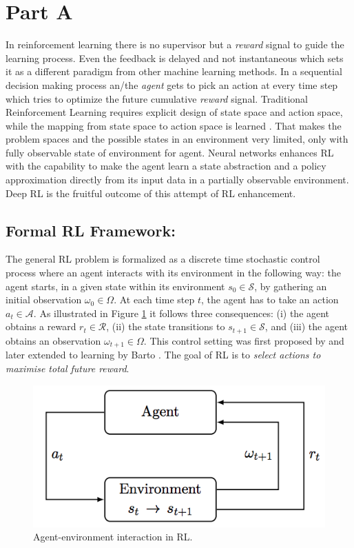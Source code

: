 \section{Part A}
\label{part_a}
In reinforcement learning there is no supervisor but a {\em reward} signal to guide the learning process. Even the feedback is delayed and not instantaneous which sets it as a different paradigm from other machine learning methods. In a sequential decision making process an/the {\em agent} gets to pick an action at every time step which tries to optimize the future cumulative {\em reward} signal.
Traditional Reinforcement Learning
requires explicit design of state space and action space, while the mapping from state space to action space is learned \cite{sutton1998introduction}.
 That makes the problem spaces and the possible states in an environment very limited, only with fully observable state of environment for agent.  Neural networks enhances RL with the capability to make the agent learn a state abstraction and a policy approximation directly from its input data in a partially observable environment. Deep RL is the fruitful outcome of this attempt of RL enhancement.

\subsection{Formal RL Framework:}
\label{formal_rl}
The general RL problem is formalized as a discrete time stochastic
control process where an agent interacts with its environment in the
following way: the agent starts, in a given state within its environment
$s_0 \in \mathcal{S}$, by gathering an initial observation $\omega_0 \in \Omega$. At each time
step $t$, the agent has to take an action $a_t \in \mathcal{A}$. As illustrated in
Figure \ref{fig:rl_01} it follows three consequences: (i) the agent obtains a reward
$r_t \in \mathcal{R}$, (ii) the state transitions to $s_{t+1} \in \mathcal{S}$, and (iii) the agent obtains
an observation $\omega_{t+1} \in \Omega$. This control setting was first proposed by
\cite{bellman1957dynamic} and later extended to learning by Barto \cite{barto1983neuronlike}.
The goal of RL is to {\em select actions to maximise total future reward}.
\begin{figure}[t]
	\includegraphics[width=0.7\linewidth ]{fig/agent.png}
    \vspace{-2mm}
    \caption{Agent-environment interaction in RL.}
    \label{fig:rl_01}
\end{figure}

